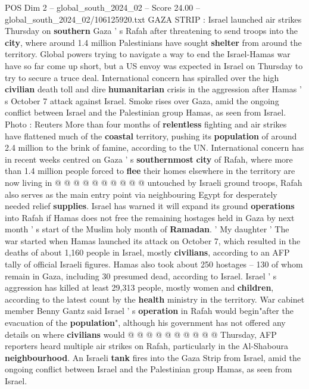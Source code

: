 \begin{textsample}{POS Dim 2 – global\_south\_2024\_02 – Score 24.00 – global\_south\_2024\_02/106125920.txt}  \label{ex:f2_pos_040}
GAZA STRIP : Israel launched air strikes Thursday on \textbf{southern} Gaza ' s Rafah after threatening to send troops into the \textbf{city}, where around 1.4 million Palestinians have sought \textbf{shelter} from around the territory.
Global powers trying to navigate a way to end the Israel-Hamas war have so far come up short, but a US envoy was expected in Israel on Thursday to try to secure a truce deal.
International concern has spiralled over the high \textbf{civilian} death toll and dire \textbf{humanitarian} crisis in the aggression after Hamas ' s October 7 attack against Israel.
Smoke rises over Gaza, amid the ongoing conflict between Israel and the Palestinian group Hamas, as seen from Israel.
Photo : Reuters More than four months of \textbf{relentless} fighting and air strikes have flattened much of the \textbf{coastal} territory, pushing its \textbf{population} of around 2.4 million to the brink of famine, according to the UN.
International concern has in recent weeks centred on Gaza ' s \textbf{southernmost} \textbf{city} of Rafah, where more than 1.4 million people forced to \textbf{flee} their homes elsewhere in the territory are now living in @ @ @ @ @ @ @ @ @ @ untouched by Israeli ground troops, Rafah also serves as the main entry point via neighbouring Egypt for desperately needed relief \textbf{supplies}.
Israel has warned it will expand its ground \textbf{operations} into Rafah if Hamas does not free the remaining hostages held in Gaza by next month ' s start of the Muslim holy month of \textbf{Ramadan}. ' My daughter ' The war started when Hamas launched its attack on October 7, which resulted in the deaths of about 1,160 people in Israel, mostly \textbf{civilians}, according to an AFP tally of official Israeli figures.
Hamas also took about 250 hostages -- 130 of whom remain in Gaza, including 30 presumed dead, according to Israel.
Israel ' s aggression has killed at least 29,313 people, mostly women and \textbf{children}, according to the latest count by the \textbf{health} ministry in the territory.
War cabinet member Benny Gantz said Israel ' s \textbf{operation} in Rafah would begin"after the evacuation of the \textbf{population}", although his government has not offered any details on where \textbf{civilians} would @ @ @ @ @ @ @ @ @ @ Thursday, AFP reporters heard multiple air strikes on Rafah, particularly in the Al-Shaboura \textbf{neighbourhood}.
An Israeli \textbf{tank} fires into the Gaza Strip from Israel, amid the ongoing conflict between Israel and the Palestinian group Hamas, as seen from Israel.

\end{textsample}
